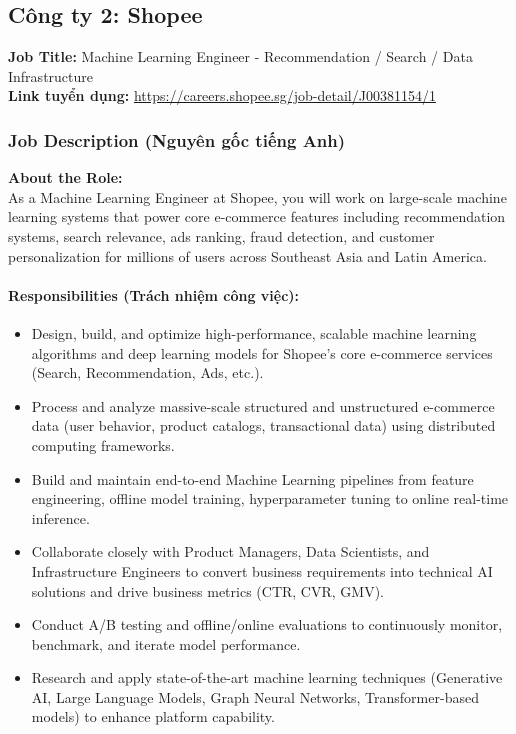 \subsection{Công ty 2: Shopee}

\noindent\textbf{Job Title:} Machine Learning Engineer - Recommendation / Search / Data Infrastructure \\
\textbf{Link tuyển dụng:} \url{https://careers.shopee.sg/job-detail/J00381154/1}

\subsubsection*{Job Description (Nguyên gốc tiếng Anh)}

\textbf{About the Role:} \\
\indent As a Machine Learning Engineer at Shopee, you will work on large-scale machine learning systems that power core e-commerce features including recommendation systems, search relevance, ads ranking, fraud detection, and customer personalization for millions of users across Southeast Asia and Latin America.

\paragraph{Responsibilities (Trách nhiệm công việc):}
\begin{itemize}
    \item Design, build, and optimize high-performance, scalable machine learning algorithms and deep learning models for Shopee’s core e-commerce services (Search, Recommendation, Ads, etc.).
    \item Process and analyze massive-scale structured and unstructured e-commerce data (user behavior, product catalogs, transactional data) using distributed computing frameworks.
    \item Build and maintain end-to-end Machine Learning pipelines from feature engineering, offline model training, hyperparameter tuning to online real-time inference.
    \item Collaborate closely with Product Managers, Data Scientists, and Infrastructure Engineers to convert business requirements into technical AI solutions and drive business metrics (CTR, CVR, GMV).
    \item Conduct A/B testing and offline/online evaluations to continuously monitor, benchmark, and iterate model performance.
    \item Research and apply state-of-the-art machine learning techniques (Generative AI, Large Language Models, Graph Neural Networks, Transformer-based models) to enhance platform capability.
\end{itemize}

